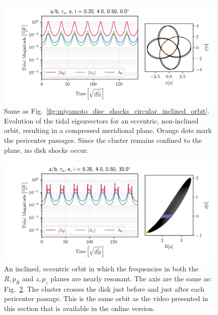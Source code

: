             \begin{figure}
                \centering
                \includegraphics[width=.9\linewidth]{images/miyamoto_disc_shocks_ab_rp_e_i_0.20_4.0_0.50_0.0.png}
                \caption[Tidal forces on an eccentric planar orbit]{Same as Fig.~\ref{fig:miyamoto_disc_shocks_circular_inclined_orbit}. Evolution of the tidal eigenvectors for an eccentric, non-inclined orbit, resulting in a compressed meridional plane. Orange dots mark the pericenter passages. Since the cluster remains confined to the plane, no disk shocks occur.}
                \label{fig:miyamoto_disc_shocks_planar_eccentric_orbit}
            \end{figure}

            \begin{figure}
                \centering
                \includegraphics[width=.9\linewidth]{images/miyamoto_disc_shocks_ab_rp_e_i_0.20_4.0_0.50_30.0.png}
                \caption[Tidal forces on a resonant inclined and eccentric orbit]{An inclined, eccentric orbit in which the frequencies in both the $R, p_R$ and $z, p_z$ planes are nearly resonant. The axis are the same as: Fig.~\ref{fig:miyamoto_disc_shocks_resonant_R_z}. The cluster crosses the disk just before and just after each pericenter passage. This is the same orbit as the video presented in this section that is available in the online version.}
                \label{fig:miyamoto_disc_shocks_resonant_R_z}
            \end{figure}
            
